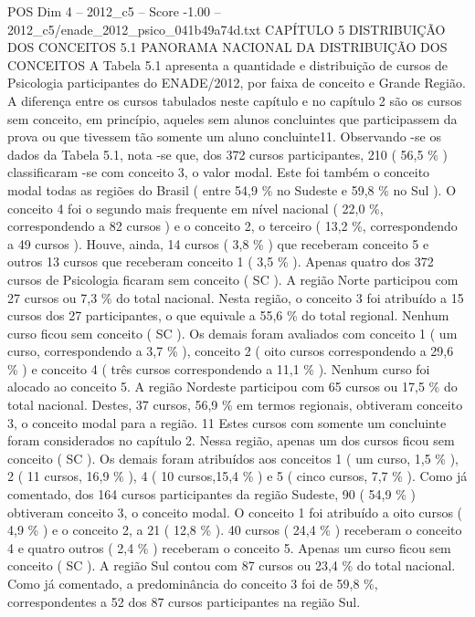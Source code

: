 \begin{textsample}{POS Dim 4 – 2012\_c5 – Score -1.00 – 2012\_c5/enade\_2012\_psico\_041b49a74d.txt}  \label{ex:f4_pos_257}
CAPÍTULO 5 DISTRIBUIÇÃO DOS CONCEITOS 5.1 PANORAMA NACIONAL DA DISTRIBUIÇÃO DOS CONCEITOS A Tabela 5.1 apresenta a quantidade e distribuição de cursos de Psicologia participantes do ENADE/2012, por faixa de conceito e Grande Região.
A diferença entre os cursos tabulados neste capítulo e no capítulo 2 são os cursos sem conceito, em princípio, aqueles sem alunos concluintes que participassem da prova ou que tivessem tão somente um aluno concluinte11.
Observando -se os dados da Tabela 5.1, nota -se que, dos 372 cursos participantes, 210 ( 56,5 \% ) classificaram -se com conceito 3, o valor modal.
Este foi também o conceito modal todas as regiões do Brasil ( entre 54,9 \% no Sudeste e 59,8 \% no Sul ).
O conceito 4 foi o segundo mais frequente em nível nacional ( 22,0 \%, correspondendo a 82 cursos ) e o conceito 2, o terceiro ( 13,2 \%, correspondendo a 49 cursos ).
Houve, ainda, 14 cursos ( 3,8 \% ) que receberam conceito 5 e outros 13 cursos que receberam conceito 1 ( 3,5 \% ).
Apenas quatro dos 372 cursos de Psicologia ficaram sem conceito ( SC ).
A região Norte participou com 27 cursos ou 7,3 \% do total nacional.
Nesta região, o conceito 3 foi atribuído a 15 cursos dos 27 participantes, o que equivale a 55,6 \% do total regional.
Nenhum curso ficou sem conceito ( SC ).
Os demais foram avaliados com conceito 1 ( um curso, correspondendo a 3,7 \% ), conceito 2 ( oito cursos correspondendo a 29,6 \% ) e conceito 4 ( três cursos correspondendo a 11,1 \% ).
Nenhum curso foi alocado ao conceito 5.
A região Nordeste participou com 65 cursos ou 17,5 \% do total nacional.
Destes, 37 cursos, 56,9 \% em termos regionais, obtiveram conceito 3, o conceito modal para a região. 11 Estes cursos com somente um concluinte foram considerados no capítulo 2.
Nessa região, apenas um dos cursos ficou sem conceito ( SC ).
Os demais foram atribuídos aos conceitos 1 ( um curso, 1,5 \% ), 2 ( 11 cursos, 16,9 \% ), 4 ( 10 cursos,15,4 \% ) e 5 ( cinco cursos, 7,7 \% ).
Como já comentado, dos 164 cursos participantes da região Sudeste, 90 ( 54,9 \% ) obtiveram conceito 3, o conceito modal.
O conceito 1 foi atribuído a oito cursos ( 4,9 \% ) e o conceito 2, a 21 ( 12,8 \% ). 40 cursos ( 24,4 \% ) receberam o conceito 4 e quatro outros ( 2,4 \% ) receberam o conceito 5.
Apenas um curso ficou sem conceito ( SC ).
A região Sul contou com 87 cursos ou 23,4 \% do total nacional.
Como já comentado, a predominância do conceito 3 foi de 59,8 \%, correspondentes a 52 dos 87 cursos participantes na região Sul.

\end{textsample}
